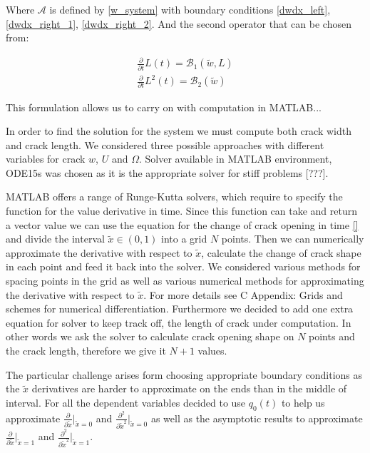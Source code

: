 Where $\mathcal{A}$ is defined by \eqref{w_system} with boundary conditions \eqref{dwdx_left},\eqref{dwdx_right_1}, \eqref{dwdx_right_2}. And the second operator that can be chosen from:

\begin{align}\label{L_operator_1}
\frac{\partial}{\partial t}L(t)=\mathcal{B}_1(\tilde w,L)
\\
\label{L_operator_2}
\frac{\partial}{\partial t}L^2(t)=\mathcal{B}_2(\tilde w)
\end{align}

This formulation allows us to carry on with computation in MATLAB...

In order to find the solution for the system we must compute both crack width and crack length. We considered three possible approaches with different variables for crack $w$, $U $ and $\Omega$. Solver available in MATLAB environment, ODE15s was chosen as it is the appropriate solver for stiff problems [???]. 

MATLAB offers a range of Runge-Kutta solvers, which require to specify the function for the value derivative in time. Since this function can take and return a vector value we can use the equation for the change of crack opening in time \eqref{} and divide the interval $\tilde x \in (0 ,1)$ into a grid $N$ points. Then we can numerically approximate the derivative with respect to $\tilde x$, calculate the change of crack shape in each point and feed it back into the solver. We considered various methods for spacing points in the grid as well as various numerical methods for approximating the derivative with respect to $\tilde x$. For more details see {\color{blue} C Appendix: Grids and schemes for numerical differentiation}. Furthermore we decided to add one extra equation for solver to keep track off, the length of crack under computation. In other words we ask the solver to calculate crack opening shape on $N$ points and the crack length, therefore we give it $N+1$ values.

The particular challenge arises form choosing appropriate boundary conditions as the $\tilde x$ derivatives are harder to approximate on the ends than in the middle of interval. For all the dependent variables decided to use $q_0(t)$ to help us approximate $\frac{\partial }{\partial \tilde x}|_{\tilde x=0}$ and $\frac{\partial^2 }{\partial \tilde x^2}|_{\tilde x=0}$ as well as the asymptotic results to approximate $\frac{\partial }{\partial \tilde x}|_{\tilde x=1}$ and $\frac{\partial^2 }{\partial \tilde x^2}|_{\tilde x=1}$. 
 


